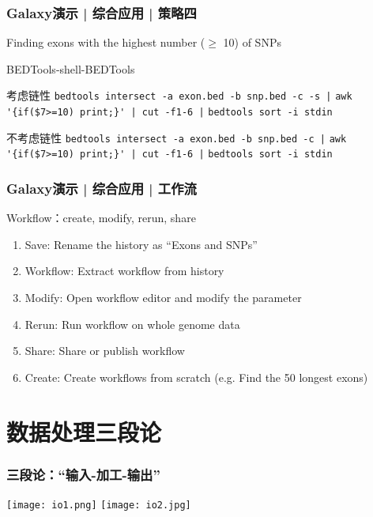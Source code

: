 \begin{frame}[fragile]
  \frametitle{Galaxy演示 | 综合应用 | 策略四}
  \begin{block}{Finding exons with the highest number ($\geq$ 10) of SNPs}
    \pause
    \begin{block}{BEDTools-shell-BEDTools}
    \pause
    \begin{block}{考虑链性}
      \verb+bedtools intersect -a exon.bed -b snp.bed -c -s |+
      \verb+awk '{if($7>=10) print;}' | cut -f1-6 |+
      \verb+bedtools sort -i stdin+
    \end{block}
    \pause
    \begin{block}{不考虑链性}
      \verb+bedtools intersect -a exon.bed -b snp.bed -c |+
      \verb+awk '{if($7>=10) print;}' | cut -f1-6 |+
      \verb+bedtools sort -i stdin+
    \end{block}
\end{block}
  \end{block}
\end{frame}


\begin{frame}
  \frametitle{Galaxy演示 | 综合应用 | \alert{工作流}}
  \begin{block}{Workflow：create, modify, rerun, share}
    \pause
  \begin{enumerate}[<+-|alert@+>]
    \item Save: Rename the history as ``Exons and SNPs''
    \item Workflow: Extract workflow from history
    \item Modify: Open workflow editor and modify the parameter
    \item Rerun: Run workflow on whole genome data
    \item Share: Share or publish workflow
    \item Create: Create workflows from scratch (e.g. Find the 50 longest exons)
  \end{enumerate}
  \end{block}
\end{frame}

\section{数据处理三段论}
\begin{frame}
  \frametitle{三段论：“输入-加工-输出”}
  \begin{center}
    \texttt{[image: io1.png]}
    \vspace{0.5cm}
    \texttt{[image: io2.jpg]}
  \end{center}
\end{frame}

